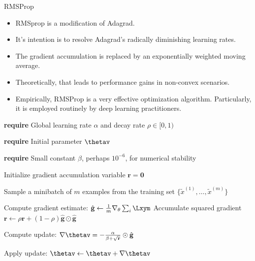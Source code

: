 
\begin{vbframe}{RMSProp}
  \begin{itemize}
    \item RMSprop is a modification of Adagrad.
    \item It's intention is to resolve Adagrad's radically diminishing learning rates.
    \item The gradient accumulation is replaced by an exponentially weighted moving average.
    \item Theoretically, that leads to performance gains in non-convex scenarios.
    \item Empirically, RMSProp is a very effective optimization algorithm. Particularly, it is employed routinely by deep learning practitioners.
  \end{itemize}
  
\framebreak
  
  
  \begin{algorithm}[H]
    \small
    \caption{RMSProp}
    \begin{algorithmic}[1]
    \State \textbf{require} Global learning rate $\alpha$ and decay rate $\rho \in [0, 1)$ \strut
    \State \textbf{require} Initial parameter $\mathbf{\thetav}$ \strut
    \State \parbox[t]{\dimexpr\linewidth-\algorithmicindent}{\textbf{require} Small constant $\beta$, perhaps $10^{-6}$, for numerical stability \strut}
    \State Initialize gradient accumulation variable $\mathbf{r} = \mathbf{0} $
        \State \parbox[t]{\dimexpr\linewidth-\algorithmicindent}{Sample a minibatch of $m$ examples from the training set $\{\tilde{x}^{(1)},\dots,\tilde{x}^{(m)}\}$ \strut}
        \State Compute gradient estimate: $\hat{\mathbf{g}} \leftarrow \frac{1}{m} \nabla_\theta \sum_{i} \Lxym$
        \State Accumulate squared gradient $\mathbf{r} \leftarrow \rho \mathbf{r} + (1 - \rho) \hat{\mathbf{g}} \odot  \hat{\mathbf{g}}$
        \State \parbox[t]{\dimexpr\linewidth-\algorithmicindent}{Compute update: $\nabla\mathbf{\thetav} = - \frac{\alpha}{\beta + \sqrt\mathbf{r}} \odot \hat{\mathbf{g}}$ \strut}
        \State Apply update: $\mathbf{\thetav} \leftarrow \mathbf{\thetav} + \nabla\mathbf{\thetav}$
      \EndWhile
    \end{algorithmic}
  \end{algorithm}
\end{vbframe}

